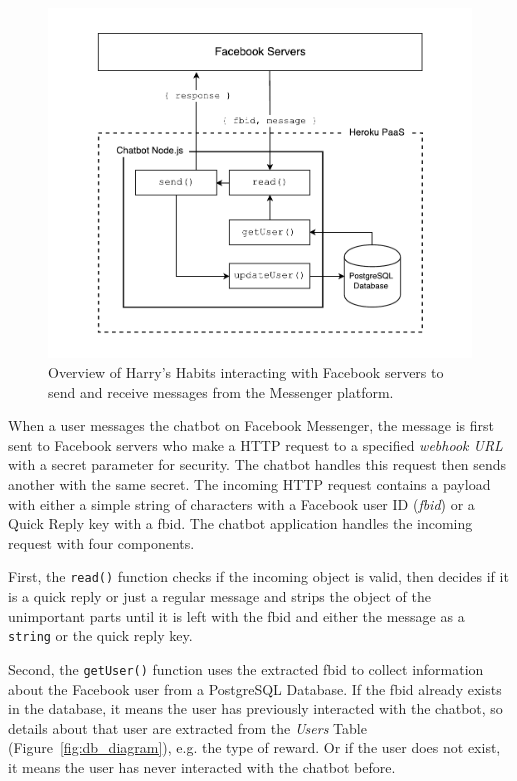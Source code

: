 \begin{figure}[H]
    \centering
    \includegraphics[width=6in]{../resources/diagrams/chatbot-detailed-overview.pdf}
    \caption{Overview of Harry's Habits interacting with Facebook servers to send and receive messages from the Messenger platform.}
    \label{fig:prototype_detailed_overview}
\end{figure}


When a user messages the chatbot on Facebook Messenger, the message is first sent to Facebook servers who make a HTTP request to a specified \textit{webhook URL} with a secret parameter for security. The chatbot handles this request then sends another with the same secret. The incoming HTTP request contains a payload with either a simple string of characters with a Facebook user ID (\textit{fbid}) or a Quick Reply key with a fbid. The chatbot application handles the incoming request with four components.

First, the \verb|read()| function checks if the incoming object is valid, then decides if it is a quick reply or just a regular message and strips the object of the unimportant parts until it is left with the fbid and either the message as a \verb|string| or the quick reply key.

Second, the \verb|getUser()| function uses the extracted fbid to collect information about the Facebook user from a PostgreSQL Database. If the fbid already exists in the database, it means the user has previously interacted with the chatbot, so details about that user are extracted from the \textit{Users} Table (Figure~\ref{fig:db_diagram}), e.g. the type of reward. Or if the user does not exist, it means the user has never interacted with the chatbot before.

